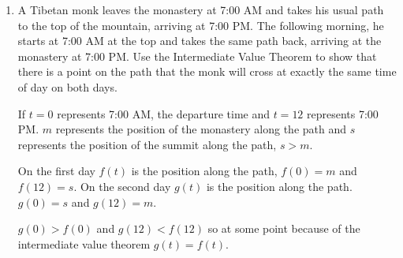 \documentclass{article}
\begin{document}
\begin{enumerate}
\begin{enumerate}
				$|0| = 0$, as $\lim \limits {x \to 0} |x| = 0$ also $|x|$ is continuous.

				\item Prove that if $f$ is a continuous function on an interval, then
					so is $|f|$.

					$$|f(x)| = \begin{cases}
						f(x) & \text{if } f(x) \geq 0 \\
						-f(x) & \text{if } f(x) < 0
						\end{cases}$$

					$$\lim \limits {f(x) \to 0^{+}} f(x) = 0$$
					$$\lim \limits {f(x) \to 0^{-}} -f(x) = 0$$

					So $\lim \limits {f(x) \to 0} |f(x)| = 0$

					$|0| = 0$ and $\lim \limits {f(x) \to 0} |f(x| = 0$ so $f(x)$ is
					continuous.
				
				\item Is the converse in the statement in part (b) alse true?
				In other words, if $|f|$ is continuous, does it follow that $f$
				is continuous? If so, prove it. If not, find a counterexample.

				The converse is also true. If a continuous function $|f|$ is

				$$|f| = \begin{cases}
					f & \text{if } f \geq 0 \\
					-f & \text{if } f < 0
					\begin{cases}$$

				Because $|f|$ is equivalent to $f$ over $[0, \infty)$, $f$ is continuous
				from $(-\infty, 0$ so we just need to prove that $f$ is continuous at $0$.

				$\lim \limits {f \to 0^{-}} f = 0$ and $\lim \limits {f \to 0^{+}} f = 0$ and
				when $|f| = 0, f = 0$ so $f$ is continuous at $0$.

			\end{enumerate}	


			\item A Tibetan monk leaves the monastery at 7:00 AM and takes his usual path to
				the top of the mountain, arriving at 7:00 PM. The following morning, he
				starts at 7:00 AM at the top and takes the same path back, arriving at
				the monastery at 7:00 PM. Use the Intermediate Value Theorem to show
				that there is a point on the path that the monk will cross at exactly the
				same time of day on both days.

				If $t = 0$ represents 7:00 AM, the departure time and $t = 12$ represents
				7:00 PM.  $m$ represents the position of the monastery along the path and 
				$s$ represents the position of the summit along the path, $s > m$.

				On the first day $f(t)$ is the position along the path, $f(0) = m$ and
				$f(12) = s$. On the second day $g(t)$ is the position along the path.
				$g(0) = s$ and $g(12) = m$.

				$g(0) > f(0)$ and $g(12) < f(12)$ so at some point because of the intermediate
				value theorem $g(t) = f(t)$.
	\end{enumerate}
\end{document}
